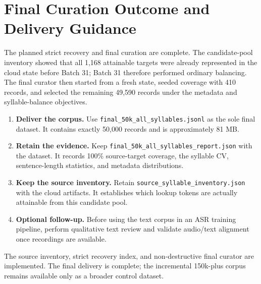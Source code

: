 \documentclass[11pt,a4paper]{article}
\begin{document}
\section{Final Curation Outcome and Delivery Guidance}
The planned strict recovery and final curation are complete. The candidate-pool inventory showed that all 1,168 attainable targets were already represented in the cloud state before Batch 31; Batch 31 therefore performed ordinary balancing. The final curator then started from a fresh state, seeded coverage with 410 records, and selected the remaining 49,590 records under the metadata and syllable-balance objectives.
\begin{enumerate}[leftmargin=1.7em]
\item \textbf{Deliver the corpus.} Use \texttt{final\_50k\_all\_syllables.jsonl} as the sole final dataset. It contains exactly 50,000 records and is approximately 81 MB.
\item \textbf{Retain the evidence.} Keep \texttt{final\_50k\_all\_syllables\_report.json} with the dataset. It records 100\% source-target coverage, the syllable CV, sentence-length statistics, and metadata distributions.
\item \textbf{Keep the source inventory.} Retain \texttt{source\_syllable\_inventory.json} with the cloud artifacts. It establishes which lookup tokens are actually attainable from this candidate pool.
\item \textbf{Optional follow-up.} Before using the text corpus in an ASR training pipeline, perform qualitative text review and validate audio/text alignment once recordings are available.
\end{enumerate}
The source inventory, strict recovery index, and non-destructive final curator are implemented. The final delivery is complete; the incremental 150k-plus corpus remains available only as a broader control dataset.
\end{document}

